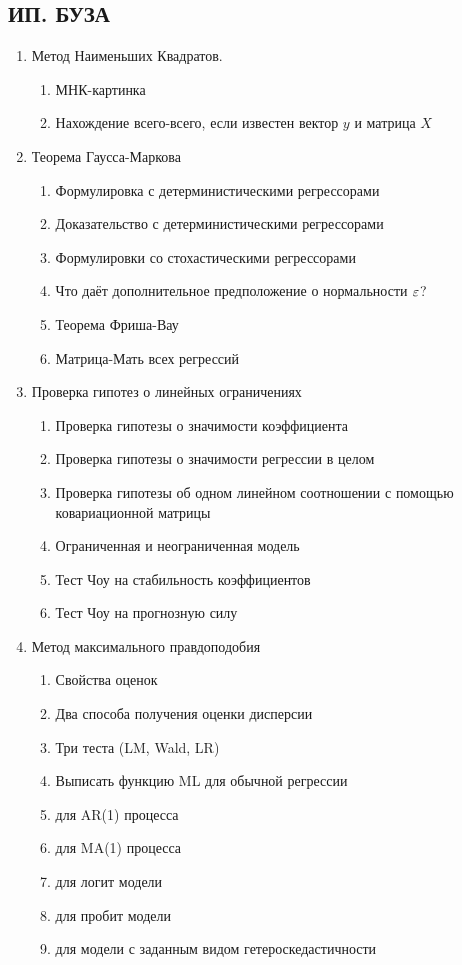 \documentclass[12pt, a4paper]{article}
\begin{document}
\subsection{ИП. БУЗА}


\begin{enumerate}

\item Метод Наименьших Квадратов.

\begin{enumerate}
\item МНК-картинка
\item Нахождение всего-всего, если известен вектор $y$ и матрица $X$
  \end{enumerate}

\item Теорема Гаусса-Маркова
\begin{enumerate}
\item Формулировка с детерминистическими регрессорами
\item Доказательство с детерминистическими регрессорами
\item Формулировки со стохастическими регрессорами
\item Что даёт дополнительное предположение о нормальности $\varepsilon$?
\item Теорема Фриша-Вау
\item Матрица-Мать всех регрессий
\end{enumerate}

\item Проверка гипотез о линейных ограничениях
\begin{enumerate}
\item Проверка гипотезы о значимости коэффициента
\item Проверка гипотезы о значимости регрессии в целом
\item Проверка гипотезы об одном линейном соотношении с помощью ковариационной матрицы
\item Ограниченная и неограниченная модель
\item Тест Чоу на стабильность коэффициентов
\item Тест Чоу на прогнозную силу
\end{enumerate}

\item Метод максимального правдоподобия

\begin{enumerate}
\item Свойства оценок
\item Два способа получения оценки дисперсии
\item Три теста (LM, Wald, LR)
\item Выписать функцию ML для обычной регрессии
\item для AR(1) процесса
\item для MA(1) процесса
\item для логит модели
\item для пробит модели
\item для модели с заданным видом гетероскедастичности
\end{enumerate}


\end{enumerate}
\end{document}
